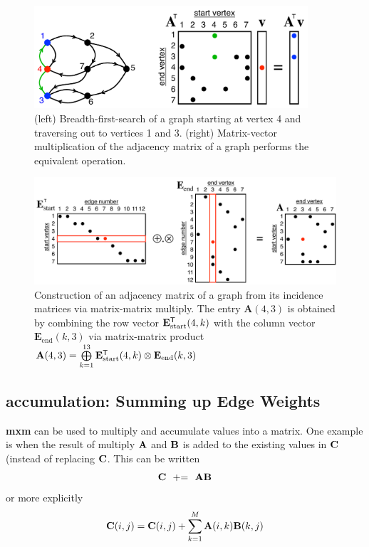 \begin{figure}[!htb]
  \centering
    \includegraphics[width=4in]{figures/AdjacencyMatrixBFS.pdf}
      \caption{(left) Breadth-first-search of a graph starting at vertex 4 and traversing out to vertices 1 and 3.  (right) Matrix-vector multiplication of the adjacency matrix of a graph performs the equivalent operation.}
      \label{fig:AdjacencyMatrixBFS}
\end{figure}
\begin{figure}[!htb]
  \centering
    \includegraphics[width=5in]{figures/AdjacencyMatrixToIncidence.pdf}
      \caption{Construction of an adjacency matrix of a graph from its incidence matrices via matrix-matrix multiply.  The entry $\mathbf{A}(4,3)$ is obtained by combining the row vector $\mathbf{E}_\mathrm{start}^{\sf T}(4,k)$ with the column vector $\mathbf{E}_\mathrm{end}(k,3)$ via matrix-matrix product $\mathbf{A}(4,3)= \bigoplus\limits_{k = 1}^{13} \mathbf{E}_\mathrm{start}^{\sf T}(4,k) \otimes \mathbf{E}_\mathrm{end}(k,3)$}
      \label{fig:AdjacencyToIncidence}
\end{figure}


\subsection{accumulation: Summing up Edge Weights}

{\bf mxm} can be used to multiply and accumulate values into a matrix.  One example is when the result of multiply ${\bf A}$ and ${\bf B}$ is added to the existing values in ${\bf C}$ (instead of replacing ${\bf C}$.  This can be written
$$
   {\bf C} ~~ {+}{=} ~~ {\bf A} {\bf B}
$$
or more explicitly
$$
   {\bf C}(i,j) = {\bf C}(i,j) + \sum_{k=1}^M {\bf A}(i,k) {\bf B}(k,j)
$$

